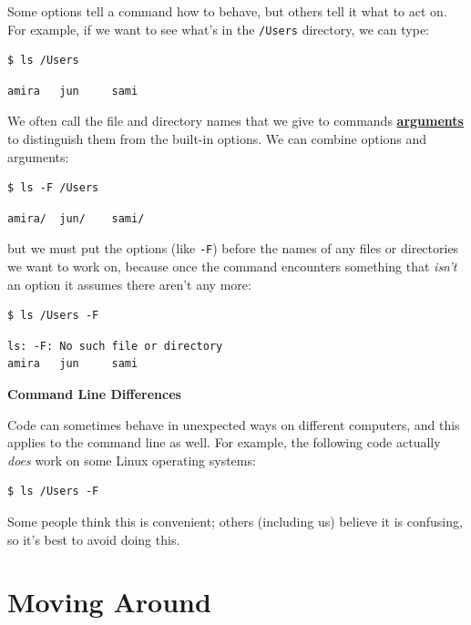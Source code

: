 \documentclass[
]{krantz}
\renewenvironment{quote}{\begin{VF}}{\end{VF}}
\newcommand{\gref}[2]{\hyperlink{#2}{\textbf{#1}}}
\begin{document}
Some options tell a command how to behave,
but others tell it what to act on.
For example,
if we want to see what's in the \texttt{/Users} directory,
we can type:

\begin{verbatim}
$ ls /Users
\end{verbatim}

\begin{verbatim}
amira   jun     sami
\end{verbatim}

We often call the file and directory names that we give to commands \gref{arguments}{command\_line\_argument}
to distinguish them from the built-in options.
We can combine options and arguments:

\begin{verbatim}
$ ls -F /Users
\end{verbatim}

\begin{verbatim}
amira/  jun/    sami/
\end{verbatim}

but we must put the options (like \texttt{-F})
before the names of any files or directories we want to work on,
because once the command encounters something that \emph{isn't} an option
it assumes there aren't any more:

\begin{verbatim}
$ ls /Users -F
\end{verbatim}

\begin{verbatim}
ls: -F: No such file or directory
amira   jun     sami
\end{verbatim}

\begin{quote}
\textbf{Command Line Differences}

Code can sometimes behave in unexpected ways on different computers,
and this applies to the command line as well.
For example,
the following code actually \emph{does} work on some Linux operating systems:

\begin{verbatim}
$ ls /Users -F
\end{verbatim}

Some people think this is convenient;
others (including us) believe it is confusing,
so it's best to avoid doing this.
\end{quote}

\hypertarget{bash-basics-navigate}{%
\section{Moving Around}\label{bash-basics-navigate}}
\end{document}
